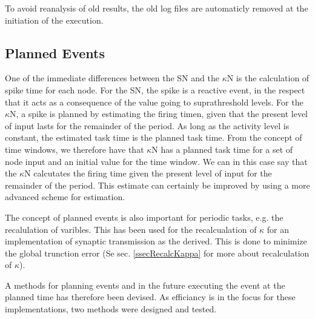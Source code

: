 To avoid reanalysis of old results, the old log files are automaticly removed at the initiation of the execution.







\subsection{Planned Events}
	\label{secPlannedEvents}
	One of the immediate differences between the SN and the $\kappa$N is the calculation of spike time for each node.
	For the SN, the spike is a reactive event, in the respect that it acts as a consequence of the value going to suprathreshold levels.
	For the $\kappa$N, a spike is planned by estimating the firing timen, given that the present level of input lasts for the remainder of the period. %
	As long as the activity level is constant, the estimated task time is the planned task time.
	From the concept of time windows, we therefore have that $\kappa$N has a planned task time for a set of node input and an initial value for the time window. %
	We can in this case say that the $\kappa$N calcutates the firing time given the present level of input for the remainder of the period.
	This estimate can certainly be improved by using a more advanced scheme for estimation.

	The concept of planned events is also important for periodic tasks, e.g. the recalulation of varibles. 
	This has been used for the recalcualation of $\kappa$ for an implementation of synaptic transmission as the derived.
	This is done to minimize the global trunction error (Se sec. \ref{ssecRecalcKappa} for more about recalculation of $\kappa$).

	A methods for planning events and in the future executing the event at the planned time has therefore been devised.
	As efficiancy is in the focus for these implementations, two methods were designed and tested.
	
